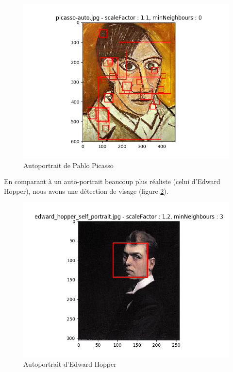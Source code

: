 \documentclass[a4paper,11pt]{article}
\begin{document}
	    \begin{figure}[H]
		\begin{center}
		    \includegraphics[scale = 0.6]{images/picasso-auto_1,1_0.png}
		    \caption{Autoportrait de Pablo Picasso}
		    \label{fig:picasso}
		\end{center}
	    \end{figure}

	En comparant à un auto-portrait beaucoup plus réaliste (celui d'Edward
	Hopper), nous avons une détection de visage (figure \ref{fig:edward}).

	    \begin{figure}[H]
	        \begin{center}
		   \includegraphics[scale = 0.6]{images/edward_hopper_self_portrait_1,2_3.png}
		   \caption{Autoportrait d'Edward Hopper}
		   \label{fig:edward}
	        \end{center}
	    \end{figure}
\end{document}

